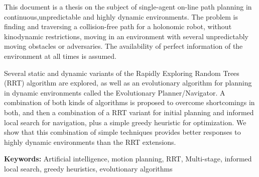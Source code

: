 
This document is a thesis on the subject of single-agent
on-line path planning in continuous,unpredictable and highly dynamic
environments. The problem is finding and traversing a collision-free path
for a holonomic robot,
without kinodynamic restrictions, moving in an environment with several
unpredictably moving obstacles or adversaries.
The availability of perfect information of the environment at all times is
assumed.

Several static and dynamic variants of the Rapidly Exploring Random Trees (RRT)
algorithm are explored, as well as an evolutionary algorithm for planning in
dynamic environments called the Evolutionary Planner/Navigator. A combination of
both kinds of algorithms is proposed to overcome shortcomings in both, and then
a combination of a RRT variant for initial planning and informed local search for
navigation, plus a simple greedy heuristic for optimization.
We show that this combination of simple techniques provides
better responses to highly dynamic environments than the RRT extensions.

\textbf{Keywords:} Artificial intelligence, motion planning, RRT, Multi-stage,
informed local search, greedy heuristics, evolutionary algorithms


